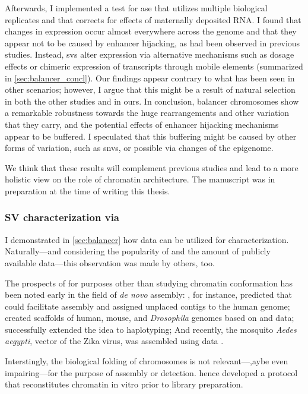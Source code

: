 Afterwards, I implemented a
test for \acl{ase} that utilizes multiple biological replicates and that
corrects for effects of maternally deposited RNA. I found that changes in
expression occur almost everywhere across the genome and that they appear not to
be caused by enhancer hijacking, as had been observed in previous studies.
Instead, \acp{sv} alter expression via alternative mechanisms such as dosage
effects or chimeric expression of transcripts through mobile elements (summarized in \cref{sec:balancer_concl}). Our
findings appear contrary to what has been seen in other scenarios; however, I
argue that this might be a result of natural selection in both the other
studies and in ours. In conclusion, balancer chromosomes show a remarkable
robustness towards the huge rearrangements and other variation that they carry,
and the potential effects of enhancer hijacking mechanisms appear to be buffered.
I speculated that this buffering might be caused by other forms of variation,
such as \acp{snv}, or possible via changes of the epigenome.

We think that these results will complement
previous studies and lead to a more holistic view on the role of chromatin
architecture. The manuscript was in preparation at the time of writing this
thesis.





\subsubsection{SV characterization via \hic}
I demonstrated in \cref{sec:balancer} how \hic data can be utilized for \sv
characterization. Naturally---and considering the popularity of \hic and the
amount of publicly available data---this observation was made by others, too.

The prospects of \hic for purposes other than studying chromatin conformation has been noted early in the field of \textit{de novo} assembly:
, for instance, predicted that \hic could facilitate assembly
and assigned unplaced contigs to the human genome;  created
scaffolds of human, mouse, and \textit{Drosophila} genomes based on \hic and
\mps data;  successfully extended the idea to haplotyping;
And recently, the mosquito \textit{Aedes aegypti}, vector of the Zika virus, was
assembled using \hic data \citep{Dudchenko2017}.

Interstingly, the biological folding of chromosomes is not relevant---,aybe even
impairing---for the purpose of assembly or \sv detection. \citet{Putnam2016}
hence developed a protocol that reconstitutes chromatin in vitro prior to \hic
library preparation.

